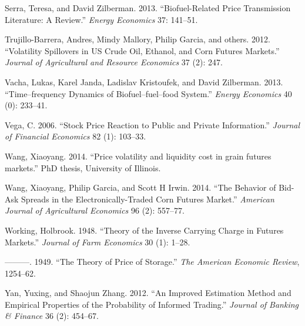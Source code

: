 \documentclass[review,12pt]{elsarticle}
\begin{document}
Serra, Teresa, and David Zilberman. 2013. ``Biofuel-Related Price
Transmission Literature: A Review.'' \emph{Energy Economics} 37:
141--51.

Trujillo-Barrera, Andres, Mindy Mallory, Philip Garcia, and others.
2012. ``Volatility Spillovers in US Crude Oil, Ethanol, and Corn Futures
Markets.'' \emph{Journal of Agricultural and Resource Economics} 37 (2):
247.

Vacha, Lukas, Karel Janda, Ladislav Kristoufek, and David Zilberman.
2013. ``Time--frequency Dynamics of Biofuel--fuel--food System.''
\emph{Energy Economics} 40 (0): 233--41.

Vega, C. 2006. ``Stock Price Reaction to Public and Private
Information.'' \emph{Journal of Financial Economics} 82 (1): 103--33.

Wang, Xiaoyang. 2014. ``Price volatility and liquidity cost in grain
futures markets.'' PhD thesis, University of Illinois.

Wang, Xiaoyang, Philip Garcia, and Scott H Irwin. 2014. ``The Behavior
of Bid-Ask Spreads in the Electronically-Traded Corn Futures Market.''
\emph{American Journal of Agricultural Economics} 96 (2): 557--77.

Working, Holbrook. 1948. ``Theory of the Inverse Carrying Charge in
Futures Markets.'' \emph{Journal of Farm Economics} 30 (1): 1--28.

---------. 1949. ``The Theory of Price of Storage.'' \emph{The American
Economic Review}, 1254--62.

Yan, Yuxing, and Shaojun Zhang. 2012. ``An Improved Estimation Method
and Empirical Properties of the Probability of Informed Trading.''
\emph{Journal of Banking \& Finance} 36 (2): 454--67.
\end{document}
